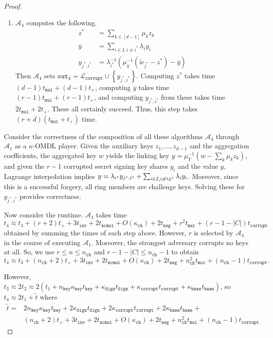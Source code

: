 \documentclass[11pt]{article}
\theoremstyle{definition}
\newcommand{\sign}{\texttt{Sign}}
\begin{document}
\begin{proof}
\begin{enumerate}
\item $\mathcal{A}_4$ computes the following.
\begin{align*}
z^* &= \sum_{k \in [d-1]} \mu_k z_k \\
\overline{y} &= \sum_{i \in I, i \neq i^*} \lambda_i y_i \\
y_{j^*,i^*} &= \lambda_{i^*}^{-1}\left(\mu_y^{-1}\left(\widetilde{w}_{j^*} - z^*\right) - \overline{y}\right)
\end{align*} Then $\mathcal{A}_4$ sets $\texttt{out}_4 = \mathcal{L}_{\texttt{corrupt}} \cup \left\{y_{j^*, i^*}\right\}$.
Computing $z^*$ takes time $(d-1)t_{\texttt{mul}} + (d-1)t_{+}$, computing $\overline{y}$ takes time $(r-1)t_{\texttt{mul}} + (r-1)t_{+}$, and computing $y_{j^*,i^*}$ from these takes time $2t_{\texttt{mul}} + 2t_{+}$. These all certainly succeed. Thus, this step takes $(r+d)(t_{\texttt{mul}} + t_+)$ time.
\end{enumerate}

Consider the correctness of the composition of all these algorithms $\mathcal{A}_4$ through $\mathcal{A}_1$ as a $\kappa$-OMDL player. Given the auxiliary keys $z_1, \ldots, z_{d-1}$ and the aggregation coefficients, the aggregated key $w$ yields the linking key $y=\mu_Y^{-1}(w-\sum_k \mu_k z_k)$, and given the $r-1$ corrupted secret signing key shares $y_i$ and the value $y$, Lagrange interpolation implies $y = \lambda_{i^*} y_{j^*,i^*} + \sum_{i \in I, i \neq \i^*} \lambda_i y_{i}$. Moreover, since this is a successful forgery, all ring members are challenge keys. Solving these for $y_{j^*,i^*}$ provides correctness.

Now consider the runtime. $\mathcal{A}_4$ takes time \[t_4 \approx t_3 + (r+2)t_{+} + 3t_{\texttt{inv}} + 2t_{\texttt{scmul}} + O(\kappa_{\texttt{ch}}) + 2t_{\texttt{neg}} + r^2t_{\texttt{mul}} + (r-1-\left|C\right|)t_{\texttt{corrupt}}\] obtained by summing the times of each step above. However, $r$ is selected by $\mathcal{A}_4$ in the course of executing $\mathcal{A}_1$. Moreover, the strongest adversary corrupts no keys at all. So, we use $r \leq n \leq n_{\texttt{ch}}$ and $r-1-\left|C\right| \leq n_{\texttt{ch}}-1$ to obtain \[t_4 \approx t_3 + (n_{\texttt{ch}}+2)t_{+} + 3t_{\texttt{inv}} + 2t_{\texttt{scmul}} + O(\kappa_{\texttt{ch}}) + 2t_{\texttt{neg}} + n_{\texttt{ch}}^2t_{\texttt{mul}} + (n_{\texttt{ch}}-1)t_{\texttt{corrupt}}.\] 

However, $t_3 \approx 2t_2 \approx 2(t_1 + n_{\texttt{key}}\kappa_{\texttt{key}}t_{\texttt{key}} + \kappa_{\sign}t_{\sign} + \kappa_{\texttt{corrupt}}t_{\texttt{corrupt}} + \kappa_{\texttt{base}} t_{\texttt{base}})$, so $t_4 \approx 2t_1 + \widetilde{t}$ where
\begin{align*}
\widetilde{t} =& 2n_{\texttt{key}}\kappa_{\texttt{key}}t_{\texttt{key}} + 2\kappa_\sign t_\sign + 2\kappa_{\texttt{corrupt}}t_{\texttt{corrupt}} + 2\kappa_{\texttt{base}}t_{\texttt{base}} + \\
& (n_{\texttt{ch}}+2)t_{+} + 3t_{\texttt{inv}} + 2t_{\texttt{scmul}} + O(\kappa_{\texttt{ch}}) + 2t_{\texttt{neg}} + n_{\texttt{ch}}^2t_{\texttt{mul}} + (n_{\texttt{ch}}-1)t_{\texttt{corrupt}}
\end{align*}


\end{proof}
\end{document}
